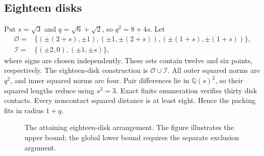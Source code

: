 \documentclass[11pt]{amsart}
\theoremstyle{definition}
\theoremstyle{remark}
\newcommand{\rhoHex}{\sqrt6+\sqrt2}
\begin{document}
\subsection{Eighteen disks}\label{sec:hexagonal}
Put $s=\sqrt3$ and $q=\rhoHex$, so $q^2=8+4s$. Let
\begin{align*}
\mathcal O={}&\{(\pm(2+s),\pm1),(\pm1,\pm(2+s)),
                   (\pm(1+s),\pm(1+s))\},\\
\mathcal I={}&\{(\pm2,0),(\pm1,\pm s)\},
\end{align*}
where signs are chosen independently. These sets contain twelve and six
points, respectively. The eighteen-disk construction is $\mathcal O\cup
\mathcal I$.
All outer squared norms are $q^2$, and inner squared norms are four.
Pair differences lie in $\mathbb Q(s)^2$, so their squared lengths reduce
using $s^2=3$. Exact finite enumeration verifies thirty disk contacts.
Every noncontact squared distance is at least eight. Hence the packing
fits in radius $1+q$.

\begin{figure}[ht]
\centering
{}
\caption{The attaining eighteen-disk arrangement.
The figure illustrates the upper bound; the global lower bound requires the
separate exclusion argument.}
\label{fig:hexagonal}
\end{figure}
\end{document}
